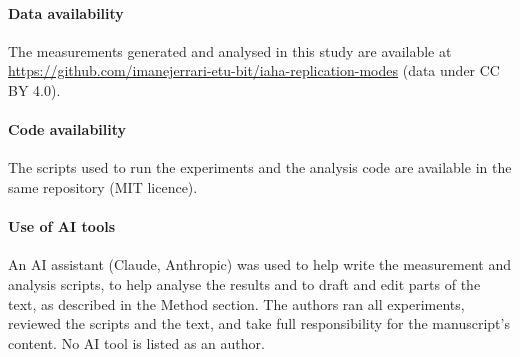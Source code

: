 \documentclass[smallextended]{svjour3}
\begin{document}
\paragraph{Data availability} The measurements generated and analysed in this study are available at \url{https://github.com/imanejerrari-etu-bit/iaha-replication-modes} (data under CC BY 4.0).
\paragraph{Code availability} The scripts used to run the experiments and the analysis code are available in the same repository (MIT licence).
\paragraph{Use of AI tools} An AI assistant (Claude, Anthropic) was used to help write the measurement and analysis scripts, to help analyse the results and to draft and edit parts of the text, as described in the Method section. The authors ran all experiments, reviewed the scripts and the text, and take full responsibility for the manuscript's content. No AI tool is listed as an author.
\end{document}
